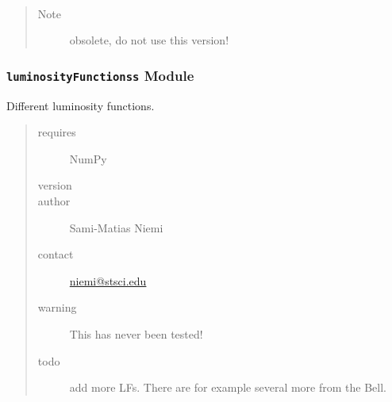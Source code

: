 \documentclass[letterpaper,10pt,english]{sphinxmanual}
\begin{document}
\begin{fulllineitems}
\label{SamPy.astronomy:SamPy.astronomy.hess_plot.hess_plot_old}~\begin{quote}\begin{description}
\item[{Note }] \leavevmode
obsolete, do not use this version!

\end{description}\end{quote}

\end{fulllineitems}



\subsubsection{\texttt{luminosityFunctionss} Module}
\label{SamPy.astronomy:luminosityfunctionss-module}\label{SamPy.astronomy:module-SamPy.astronomy.luminosityFunctionss}
Different luminosity functions.
\begin{quote}\begin{description}
\item[{requires}] \leavevmode
NumPy

\item[{version}] 

\item[{author}] \leavevmode
Sami-Matias Niemi

\item[{contact}] \leavevmode
\href{mailto:niemi@stsci.edu}{niemi@stsci.edu}

\item[{warning}] \leavevmode
This has never been tested!

\item[{todo}] \leavevmode
add more LFs. There are for example several more from the Bell.

\end{description}\end{quote}

\end{document}

